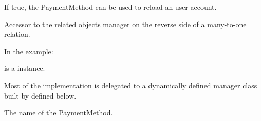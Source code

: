 \documentclass[letterpaper,10pt,english]{sphinxmanual}
\begin{document}
\begin{fulllineitems}
\begin{fulllineitems}
\label{\detokenize{modules/models:preferences.models.PaymentMethod.is_usable_in_reload}}
If true, the PaymentMethod can be used to reload an user account.

\end{fulllineitems}


\begin{fulllineitems}
\label{\detokenize{modules/models:preferences.models.PaymentMethod.menuhistory_set}}
Accessor to the related objects manager on the reverse side of a
many-to-one relation.

In the example:

\begin{sphinxVerbatim}[commandchars=\\\{\}]
 
       
\end{sphinxVerbatim}

 is a  instance.

Most of the implementation is delegated to a dynamically defined manager
class built by  defined below.

\end{fulllineitems}


\begin{fulllineitems}
\label{\detokenize{modules/models:preferences.models.PaymentMethod.name}}
The name of the PaymentMethod.

\end{fulllineitems}



\end{fulllineitems}
\end{document}
